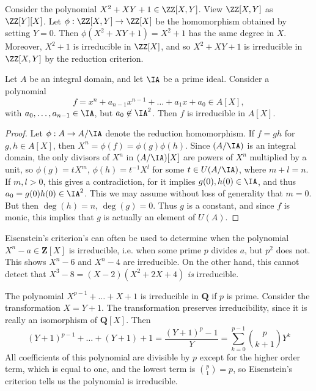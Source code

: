 \begin{example}
    Consider the polynomial $X^2 + XY + 1 \in \ZZ[X,Y]$. View $\ZZ[X,Y]$ as $\ZZ[Y][X]$. Let $\phi: \ZZ[X,Y] \to \ZZ[X]$ be the homomorphism obtained by setting $Y = 0$. Then $\phi(X^2 + XY + 1) = X^2 + 1$ has the same degree in $X$. Moreover, $X^2 + 1$ is irreducible in $\ZZ[X]$, and so $X^2 + XY + 1$ is irreducible in $\ZZ[X,Y]$ by the reduction criterion.
\end{example}

\begin{theorem}[Eisenstein]
    Let $A$ be an integral domain, and let $\IA$ be a prime ideal. Consider a polynomial
    \[ f = x^n + a_{n-1}x^{n-1} + \dots + a_1x + a_0 \in A[X], \]
    with $a_0,\dots,a_{n-1} \in \IA$, but $a_0 \not \in \IA^2$. Then $f$ is irreducible in $A[X]$.
\end{theorem}
\begin{proof}
    Let $\phi: A \to A / \IA$ denote the reduction homomorphism. If $f = gh$ for $g,h \in A[X]$, then $X^n = \phi(f) = \phi(g) \phi(h)$. Since $(A/\IA)$ is an integral domain, the only divisors of $X^n$ in $(A/\IA)[X]$ are powers of $X^n$ multiplied by a unit, so $\phi(g) = t X^m$, $\phi(h) = t^{-1} X^l$ for some $t \in U(A/\IA)$, where $m + l = n$. If $m,l > 0$, this gives a contradiction, for it implies $g(0),h(0) \in \IA$, and thus $a_0 = g(0)h(0) \in \IA^2$. This we may assume without loss of generality that $m = 0$. But then $\deg(h) = n$, $\deg(g) = 0$. Thus $g$ is a constant, and since $f$ is monic, this implies that $g$ is actually an element of $U(A)$.
\end{proof}

\begin{example}
    Eisenstein's criterion's can often be used to determine when the polynomial $X^n - a \in \mathbf{Z}[X]$ is irreducible, i.e. when some prime $p$ divides $a$, but $p^2$ does not. This shows $X^n - 6$ and $X^n - 4$ are irreducible. On the other hand, this cannot detect that $X^3 - 8 = (X - 2)(X^2 + 2X + 4)$ {\it is} irreducible.
\end{example}

\begin{example}
    The polynomial $X^{p-1} + \dots + X + 1$ is irreducible in $\mathbf{Q}$ if $p$ is prime. Consider the transformation $X = Y + 1$. The transformation preserves irreducibility, since it is really an isomorphism of $\mathbf{Q}[X]$. Then
    \[ (Y + 1)^{p-1} + \dots + (Y + 1) + 1 = \frac{(Y + 1)^p - 1}{Y} = \sum_{k = 0}^{p-1} \binom{p}{k+1} Y^k \]
    All coefficients of this polynomial are divisible by $p$ except for the higher order term, which is equal to one, and the lowest term is $\binom{p}{1} = p$, so Eisenstein's criterion tells us the polynomial is irreducible.
\end{example}

